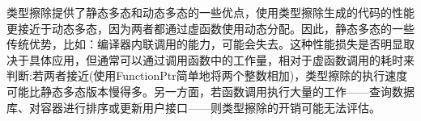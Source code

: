 类型擦除提供了静态多态和动态多态的一些优点，使用类型擦除生成的代码的性能更接近于动态多态，因为两者都通过虚函数使用动态分配。因此，静态多态的一些传统优势，比如：编译器内联调用的能力，可能会失去。这种性能损失是否明显取决于具体应用，但通常可以通过调用函数中的工作量，相对于虚函数调用的耗时来判断:若两者接近(使用FunctionPtr简单地将两个整数相加)，类型擦除的执行速度可能比静态多态版本慢得多。另一方面，若函数调用执行大量的工作——查询数据库、对容器进行排序或更新用户接口——则类型擦除的开销可能无法评估。